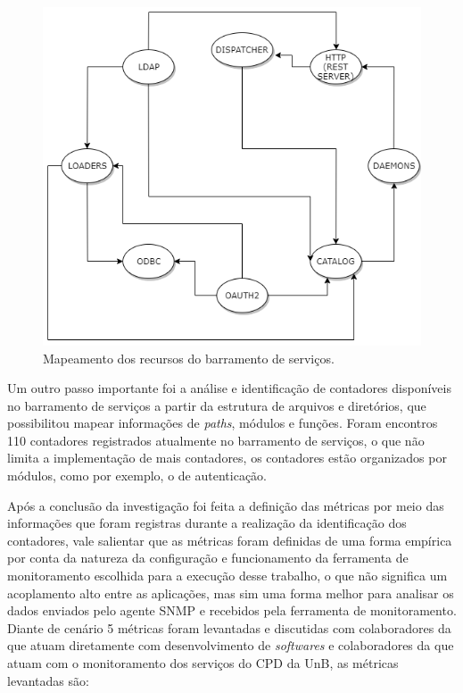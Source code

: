 \begin{figure}[h!]
	\begin{center}
	\includegraphics[scale = 0.70]{img/ResourcesEMS.png}
	\caption{Mapeamento dos recursos do barramento de serviços.}
	\label{fun:fig:ResourcesEMS}
	\end{center}
\end{figure}

Um outro passo importante foi a análise e identificação de contadores disponíveis no barramento de serviços a partir da estrutura de arquivos e diretórios, que possibilitou mapear informações de \textit{paths}, módulos e funções. Foram encontros 110 contadores registrados atualmente no barramento de serviços, o que não limita a implementação de mais contadores, os contadores estão organizados por módulos, como por exemplo, o de autenticação.  

Após a conclusão da investigação foi feita a definição das métricas por meio das informações que foram registras durante a realização da identificação dos contadores, vale salientar que as métricas foram definidas de uma forma empírica por conta da natureza da configuração e funcionamento da ferramenta de monitoramento escolhida para a execução desse trabalho, o que não significa um acoplamento alto entre as aplicações, mas sim uma forma melhor para analisar os dados enviados pelo agente \acrshort{SNMP} e recebidos pela ferramenta de monitoramento. Diante de cenário 5 métricas foram levantadas e discutidas com colaboradores da que atuam diretamente com desenvolvimento de  \textit{softwares} e colaboradores da que atuam com o monitoramento dos serviços do \acrshort{CPD} da \acrshort{UnB}, as métricas levantadas são: 

